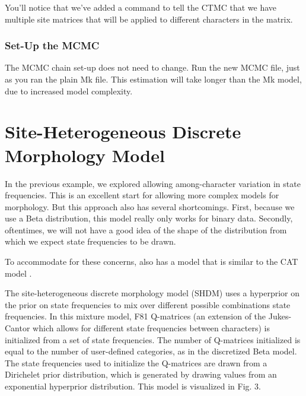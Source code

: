 You'll notice that we've added a command to tell the CTMC that we have multiple site matrices that will be applied to different characters in the matrix.

\medskip
\subsubsection{Set-Up the MCMC}

The MCMC chain set-up does not need to change. 
Run the new MCMC file, just as you ran the plain Mk file.
This estimation will take longer than the Mk model, due to increased model complexity. \par


\section{Site-Heterogeneous Discrete Morphology Model} \label{sec:dm_dir}

\begin{figure}[h!]
\label{fig:module-relaxed morphology}
\end{figure}

In the previous example, we explored allowing among-character variation in state frequencies.
This is an excellent start for allowing more complex models for morphology.
But this approach also has several shortcomings.
First, because we use a Beta distribution, this model really only works for binary data.
Secondly, oftentimes, we will not have a good idea of the shape of the distribution from which we expect state frequencies to be drawn. \par
To accommodate for these concerns, \RevBayes also has a model that is similar to the CAT model \citep{Lartillot2004}. \par
The site-heterogeneous discrete morphology model (SHDM) uses a hyperprior on the prior on state frequencies to mix over different possible combinations state frequencies.
In this mixture model, F81 Q-matrices (an extension of the Jukes-Cantor which allows for different state frequencies between characters) is initialized from a set of state frequencies.
The number of Q-matrices initialized is equal to the number of user-defined categories, as in the discretized Beta model.
The state frequencies used to initialize the Q-matrices are drawn from a Dirichelet prior distribution, which is generated by drawing values from an exponential hyperprior distribution. 
This model is visualized in Fig. 3.\par

